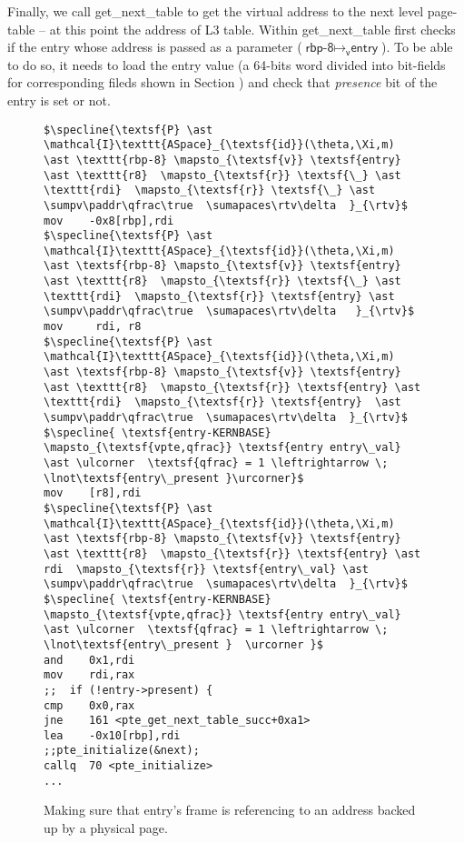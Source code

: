 Finally, we call \textsf{get\_next\_table} to get the virtual address to the next level page-table -- at this point the address of L3 table.
Within \textsf{get\_next\_table} first checks if the entry whose address is passed as a parameter ($\textsf{rbp-8} \mapsto_{\textsf{v}} \textsf{entry}$). To be able to do so, it needs to load the entry value (a 64-bits word divided into bit-fields for corresponding fileds shown in Section {}) and check that \textit{presence} bit of the entry is set or not.

\begin{figure}\footnotesize
  \begin{lstlisting}[mathescape]
$\specline{\textsf{P} \ast \mathcal{I}\texttt{ASpace}_{\textsf{id}}(\theta,\Xi,m)  \ast \texttt{rbp-8} \mapsto_{\textsf{v}} \textsf{entry} \ast \texttt{r8}  \mapsto_{\textsf{r}} \textsf{\_} \ast \texttt{rdi}  \mapsto_{\textsf{r}} \textsf{\_} \ast \sumpv\paddr\qfrac\true  \sumapaces\rtv\delta  }_{\rtv}$
mov    -0x8[rbp],rdi
$\specline{\textsf{P} \ast \mathcal{I}\texttt{ASpace}_{\textsf{id}}(\theta,\Xi,m)  \ast \textsf{rbp-8} \mapsto_{\textsf{v}} \textsf{entry} \ast \texttt{r8}  \mapsto_{\textsf{r}} \textsf{\_} \ast \texttt{rdi}  \mapsto_{\textsf{r}} \textsf{entry} \ast \sumpv\paddr\qfrac\true  \sumapaces\rtv\delta   }_{\rtv}$
mov     rdi, r8
$\specline{\textsf{P} \ast \mathcal{I}\texttt{ASpace}_{\textsf{id}}(\theta,\Xi,m)  \ast \textsf{rbp-8} \mapsto_{\textsf{v}} \textsf{entry} \ast \texttt{r8}  \mapsto_{\textsf{r}} \textsf{entry} \ast \texttt{rdi}  \mapsto_{\textsf{r}} \textsf{entry}  \ast \sumpv\paddr\qfrac\true  \sumapaces\rtv\delta  }_{\rtv}$
$\specline{ \textsf{entry-KERNBASE} \mapsto_{\textsf{vpte,qfrac}} \textsf{entry entry\_val} \ast \ulcorner  \textsf{qfrac} = 1 \leftrightarrow \; \lnot\textsf{entry\_present }\urcorner}$
mov    [r8],rdi
$\specline{\textsf{P} \ast \mathcal{I}\texttt{ASpace}_{\textsf{id}}(\theta,\Xi,m)  \ast \textsf{rbp-8} \mapsto_{\textsf{v}} \textsf{entry} \ast \texttt{r8}  \mapsto_{\textsf{r}} \textsf{entry} \ast rdi  \mapsto_{\textsf{r}} \textsf{entry\_val} \ast \sumpv\paddr\qfrac\true  \sumapaces\rtv\delta  }_{\rtv}$
$\specline{ \textsf{entry-KERNBASE} \mapsto_{\textsf{vpte,qfrac}} \textsf{entry entry\_val} \ast \ulcorner  \textsf{qfrac} = 1 \leftrightarrow \; \lnot\textsf{entry\_present }  \urcorner }$
and    0x1,rdi
mov    rdi,rax
;;  if (!entry->present) {
cmp    0x0,rax
jne    161 <pte_get_next_table_succ+0xa1>
lea    -0x10[rbp],rdi
;;pte_initialize(&next);
callq  70 <pte_initialize>
...
\end{lstlisting}
\vspace{-1em}
\caption{Making sure that \textsf{entry}'s frame is referencing to an address backed up by a physical page.}
\label{fig:calltopteinitialize}
\end{figure}

